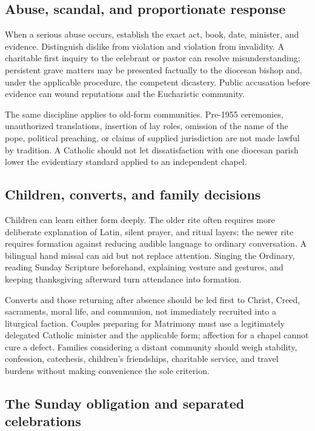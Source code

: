 \subsection{Abuse, scandal, and proportionate response}

When a serious abuse occurs, establish the exact act, book, date, minister, and evidence. Distinguish dislike from violation and violation from invalidity. A charitable first inquiry to the celebrant or pastor can resolve misunderstanding; persistent grave matters may be presented factually to the diocesan bishop and, under the applicable procedure, the competent dicastery. Public accusation before evidence can wound reputations and the Eucharistic community.

The same discipline applies to old-form communities. Pre-1955 ceremonies, unauthorized translations, insertion of lay roles, omission of the name of the pope, political preaching, or claims of supplied jurisdiction are not made lawful by tradition. A Catholic should not let dissatisfaction with one diocesan parish lower the evidentiary standard applied to an independent chapel.

\subsection{Children, converts, and family decisions}

Children can learn either form deeply. The older rite often requires more deliberate explanation of Latin, silent prayer, and ritual layers; the newer rite requires formation against reducing audible language to ordinary conversation. A bilingual hand missal can aid but not replace attention. Singing the Ordinary, reading Sunday Scripture beforehand, explaining vesture and gestures, and keeping thanksgiving afterward turn attendance into formation.

Converts and those returning after absence should be led first to Christ, Creed, sacraments, moral life, and communion, not immediately recruited into a liturgical faction. Couples preparing for Matrimony must use a legitimately delegated Catholic minister and the applicable form; affection for a chapel cannot cure a defect. Families considering a distant community should weigh stability, confession, catechesis, children's friendships, charitable service, and travel burdens without making convenience the sole criterion.

\subsection{The Sunday obligation and separated celebrations}

